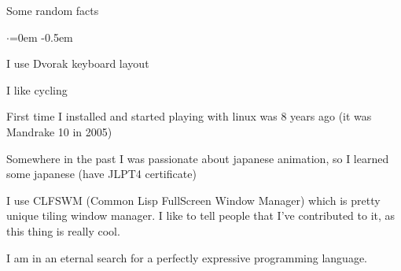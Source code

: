\documentclass{resume} %
\begin{document}

\begin{rSection}{Some random facts}
  \smallskip
  \begin{list}{$\cdot$}{\leftmargin=0em} %
    \itemsep -0.5em \vspace{-0.5em} %
  \item I use Dvorak keyboard layout
  \item I like cycling
  \item First time I installed and started playing with linux was 8 years ago (it was
    Mandrake 10 in 2005)
  \item Somewhere in the past I was passionate about japanese animation, so I learned
    some japanese (have JLPT4 certificate)
  \item I use CLFSWM (Common Lisp FullScreen Window Manager) which is pretty unique tiling
    window manager. I like to tell people that I've contributed to it, as this thing
    is really cool.
  \item I am in an eternal search for a perfectly expressive programming language.
  \end{list}
\end{rSection}

\end{document}
